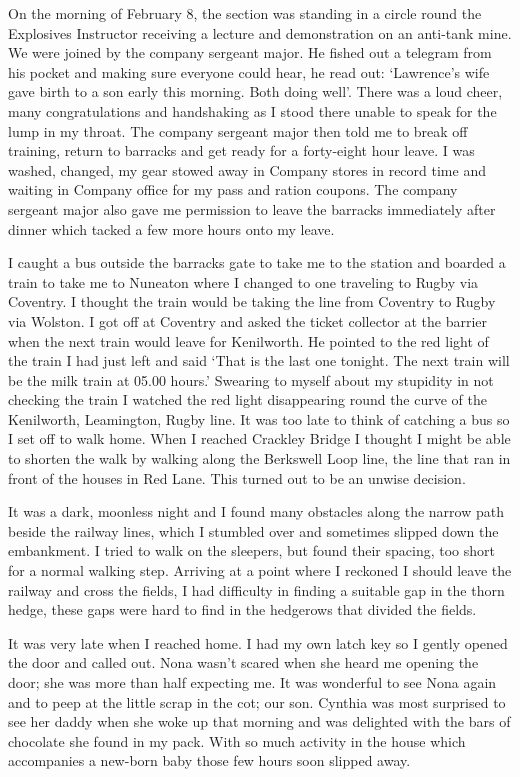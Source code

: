 On the morning of February 8, the section was standing in a circle
round the Explosives Instructor receiving a lecture and demonstration
on an anti-tank mine. We were joined by the company sergeant major.
He fished out a telegram from his pocket and making sure everyone
could hear, he read out: `\Sapper Lawrence's wife gave birth to a son
early this morning. Both doing well'. There was a loud cheer, many
congratulations and handshaking as I stood there unable to speak for
the lump in my throat. The company sergeant major then told me to
break off training, return to barracks and get ready for a forty-eight
hour leave. I was washed, changed, my gear stowed away in Company
stores in record time and waiting in Company office for my pass and
ration coupons. The company sergeant major also gave me permission to leave the
barracks immediately after dinner which tacked a few more hours onto
my leave.

I caught a bus outside the barracks gate to take me to the station and
boarded a train to take me to Nuneaton where I changed to one
traveling to Rugby via Coventry. I thought the train would be taking
the line from Coventry to Rugby via Wolston. I got off at Coventry
and asked the ticket collector at the barrier when the next train
would leave for Kenilworth. He pointed to the red light of the train
I had just left and said `That is the last one tonight. The next
train will be the milk train at 05.00 hours.'  Swearing to myself
about my stupidity in not checking the train I watched the red light
disappearing round the curve of the Kenilworth, Leamington, Rugby line.
It was too late to think of catching a bus so I set off to walk home.
When I reached Crackley Bridge I thought I might be able to shorten
the walk by walking along the Berkswell Loop line, the line that ran
in front of the houses in Red Lane. This turned out to be an unwise
decision.

It was a dark, moonless night and I found many obstacles along the
narrow path beside the railway lines, which I stumbled over and
sometimes slipped down the embankment. I tried to walk on the
sleepers, but found their spacing, too short for a normal walking
step. Arriving at a point where I reckoned I should leave the railway
and cross the fields, I had difficulty in finding a suitable gap in
the thorn hedge, these gaps were hard to find in the hedgerows that
divided the fields. 

It was very late when I reached home. I had my own latch key so I
gently opened the door and called out. Nona wasn't scared when she
heard me opening the door; she was more than half expecting me. It
was wonderful to see Nona again and to peep at the little scrap in the
cot; our son. Cynthia was most surprised to see her daddy when she
woke up that morning and was delighted with the bars of chocolate she
found in my pack. With so much activity in the house which
accompanies a new-born baby those few hours soon slipped away. 

